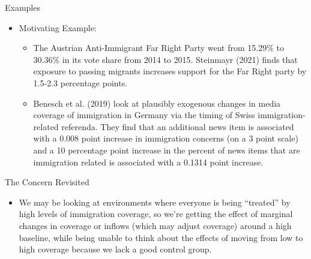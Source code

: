 \documentclass[12pt, aspectratio=169]{beamer}
\begin{document}
\begin{frame}{Examples}

    \begin{itemize}
        \item Motivating Example: 
        \begin{itemize}
            \item The Austrian Anti-Immigrant Far Right Party went from 
                15.29\% to 30.36\% in its vote share from 2014 to 2015. Steinmayr (2021)
                finds that exposure to passing migrants increases support for the 
                Far Right party by 1.5-2.3 percentage points.
            \item Benesch et al. (2019) look at plausibly exogenous changes in 
                media coverage of immigration in Germany via the timing 
                of Swiss immigration-related referenda. They find that an 
                additional news item is associated with a 0.008 point increase 
                in immigration concerns (on a 3 point scale) and
                a 10 percentage point increase in the percent of news items 
                that are immigration related is associated with a 0.1314 point increase.
        \end{itemize}
    \end{itemize}

\end{frame}



\begin{frame}{The Concern Revisited}
    \begin{itemize}
        \item We may be looking at environments where everyone is 
            being ``treated'' by high levels of immigration coverage, so we're getting 
            the effect of marginal changes in coverage or inflows (which may 
            adjust coverage) around a high baseline, while 
            being unable to think about the effects of moving from low 
            to high coverage because we lack a good control group.
    \end{itemize}
\end{frame}
\end{document}
